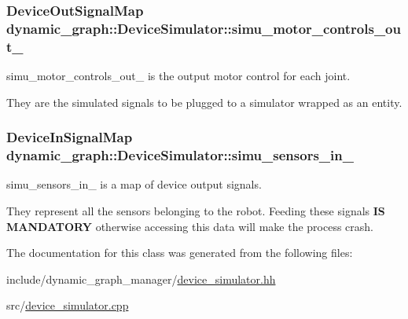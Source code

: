\subsubsection[{\texorpdfstring{simu\+\_\+motor\+\_\+controls\+\_\+out\+\_\+}{simu_motor_controls_out_}}]{\setlength{\rightskip}{0pt plus 5cm}Device\+Out\+Signal\+Map dynamic\+\_\+graph\+::\+Device\+Simulator\+::simu\+\_\+motor\+\_\+controls\+\_\+out\+\_\+}\hypertarget{classdynamic__graph_1_1DeviceSimulator_abbbcc26f173788b15a395ff87f3925e1}{}\label{classdynamic__graph_1_1DeviceSimulator_abbbcc26f173788b15a395ff87f3925e1}


simu\+\_\+motor\+\_\+controls\+\_\+out\+\_\+ is the output motor control for each joint. 

They are the simulated signals to be plugged to a simulator wrapped as an entity. 
\subsubsection[{\texorpdfstring{simu\+\_\+sensors\+\_\+in\+\_\+}{simu_sensors_in_}}]{\setlength{\rightskip}{0pt plus 5cm}Device\+In\+Signal\+Map dynamic\+\_\+graph\+::\+Device\+Simulator\+::simu\+\_\+sensors\+\_\+in\+\_\+}\hypertarget{classdynamic__graph_1_1DeviceSimulator_a8640ee078f06fc5f31efcb2b35c9ed99}{}\label{classdynamic__graph_1_1DeviceSimulator_a8640ee078f06fc5f31efcb2b35c9ed99}


simu\+\_\+sensors\+\_\+in\+\_\+ is a map of device output signals. 

They represent all the sensors belonging to the robot. Feeding these signals {\bfseries  IS M\+A\+N\+D\+A\+T\+O\+RY } otherwise accessing this data will make the process crash. 

The documentation for this class was generated from the following files\+:\begin{DoxyCompactItemize}
\item 
include/dynamic\+\_\+graph\+\_\+manager/\hyperlink{device__simulator_8hh}{device\+\_\+simulator.\+hh}\item 
src/\hyperlink{device__simulator_8cpp}{device\+\_\+simulator.\+cpp}\end{DoxyCompactItemize}
